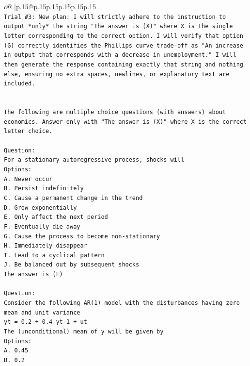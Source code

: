 \documentclass{article}
\begin{document}
{\begin{supertabular}{c@{$\;$}|p{.15\linewidth}@{}p{.15\linewidth}p{.15\linewidth}p{.15\linewidth}p{.15\linewidth}p{.15\linewidth}}
{{{\\ 
\texttt{Trial \#3: New plan: I will strictly adhere to the instruction to output *only* the string "The answer is (X)" where X is the single letter corresponding to the correct option. I will verify that option (G) correctly identifies the Phillips curve trade{-}off as "An increase in output that corresponds with a decrease in unemployment." I will then generate the response containing exactly that string and nothing else, ensuring no extra spaces, newlines, or explanatory text are included.} \\
\\ 
\\ 
\texttt{The following are multiple choice questions (with answers) about economics. Answer only with "The answer is (X)" where X is the correct letter choice.} \\
\\ 
\texttt{Question:} \\
\texttt{For a stationary autoregressive process, shocks will} \\
\texttt{Options:} \\
\texttt{A. Never occur} \\
\texttt{B. Persist indefinitely} \\
\texttt{C. Cause a permanent change in the trend} \\
\texttt{D. Grow exponentially} \\
\texttt{E. Only affect the next period} \\
\texttt{F. Eventually die away} \\
\texttt{G. Cause the process to become non{-}stationary} \\
\texttt{H. Immediately disappear} \\
\texttt{I. Lead to a cyclical pattern} \\
\texttt{J. Be balanced out by subsequent shocks} \\
\texttt{The answer is (F)} \\
\\ 
\texttt{Question:} \\
\texttt{Consider the following AR(1) model with the disturbances having zero mean and unit variance} \\
\texttt{yt = 0.2 + 0.4 yt{-}1 + ut} \\
\texttt{The (unconditional) mean of y will be given by} \\
\texttt{Options:} \\
\texttt{A. 0.45} \\
\texttt{B. 0.2} \\
}}}
\end{supertabular}}
\end{document}
